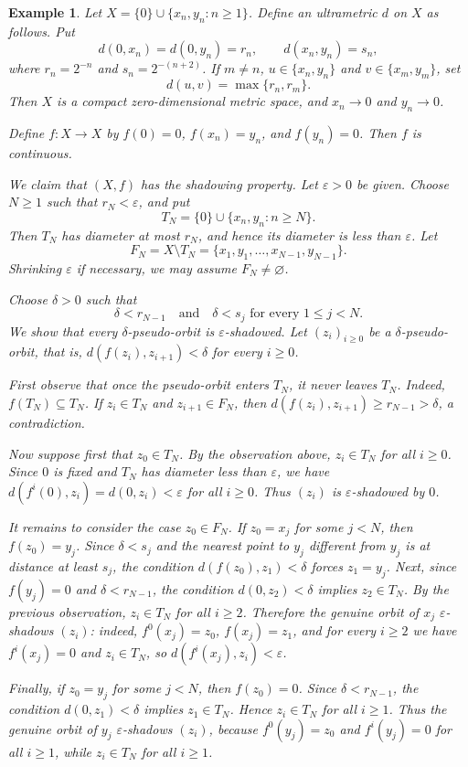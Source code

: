 \documentclass[10pt,a4paper]{amsart}
\numberwithin{equation}{section}
\newtheorem{example}[theorem]{Example}
\begin{document}
\begin{example}
Let $X=\{0\}\cup\{x_n,y_n:n\geq 1\}$. Define an ultrametric $d$ on $X$ as
follows. Put
\[
    d(0,x_n)=d(0,y_n)=r_n,\qquad d(x_n,y_n)=s_n,
\]
where $r_n=2^{-n}$ and $s_n=2^{-(n+2)}$. If $m\neq n$,
$u\in\{x_n,y_n\}$ and $v\in\{x_m,y_m\}$, set
\[
    d(u,v)=\max\{r_n,r_m\}.
\]
Then $X$ is a compact zero-dimensional metric space, and $x_n\to 0$ and
$y_n\to 0$.

Define $f:X\to X$ by $f(0)=0$, $f(x_n)=y_n$, and $f(y_n)=0$. Then $f$ is
continuous.

We claim that $(X,f)$ has the shadowing property. Let $\varepsilon>0$ be given.
Choose $N\geq 1$ such that $r_N<\varepsilon$, and put
\[
    T_N=\{0\}\cup\{x_n,y_n:n\geq N\}.
\]
Then $T_N$ has diameter at most $r_N$, and hence its diameter is less than
$\varepsilon$. Let
\[
    F_N=X\setminus T_N=\{x_1,y_1,\ldots,x_{N-1},y_{N-1}\}.
\]
Shrinking $\varepsilon$ if necessary,  we may assume
$F_N\neq\varnothing$.

Choose $\delta>0$ such that
\[
    \delta< r_{N-1}
    \quad\text{and}\quad
    \delta<s_j \text{ for every } 1\leq j<N.
\]
We show that every $\delta$-pseudo-orbit is $\varepsilon$-shadowed. Let
$(z_i)_{i\geq 0}$ be a $\delta$-pseudo-orbit, that is,
$d(f(z_i),z_{i+1})<\delta$ for every $i\geq 0$.

First observe that once the pseudo-orbit enters $T_N$, it never leaves $T_N$.
Indeed, $f(T_N)\subseteq T_N$. If $z_i\in T_N$ and $z_{i+1}\in F_N$, then
$d(f(z_i),z_{i+1})\geq r_{N-1}>\delta$, a contradiction.

Now suppose first that $z_0\in T_N$. By the observation above, $z_i\in T_N$ for
all $i\geq 0$. Since $0$ is fixed and $T_N$ has diameter less than
$\varepsilon$, we have $d(f^i(0),z_i)=d(0,z_i)<\varepsilon$ for all $i\geq 0$.
Thus $(z_i)$ is $\varepsilon$-shadowed by $0$.

It remains to consider the case $z_0\in F_N$. If $z_0=x_j$ for some $j<N$, then
$f(z_0)=y_j$. Since $\delta<s_j$ and the nearest point to $y_j$ different from
$y_j$ is at distance at least $s_j$, the condition
$d(f(z_0),z_1)<\delta$ forces $z_1=y_j$. Next, since $f(y_j)=0$ and
$\delta<r_{N-1}$, the condition $d(0,z_2)<\delta$ implies $z_2\in T_N$.
By the previous observation, $z_i\in T_N$ for all $i\geq 2$. Therefore the
genuine orbit of $x_j$ $\varepsilon$-shadows $(z_i)$: indeed,
$f^0(x_j)=z_0$, $f(x_j)=z_1$, and for every $i\geq 2$ we have
$f^i(x_j)=0$ and $z_i\in T_N$, so $d(f^i(x_j),z_i)<\varepsilon$.

Finally, if $z_0=y_j$ for some $j<N$, then $f(z_0)=0$. Since
$\delta<r_{N-1}$, the condition $d(0,z_1)<\delta$ implies $z_1\in T_N$.
Hence $z_i\in T_N$ for all $i\geq 1$. Thus the genuine orbit of $y_j$
$\varepsilon$-shadows $(z_i)$, because $f^0(y_j)=z_0$ and $f^i(y_j)=0$ for
all $i\geq 1$, while $z_i\in T_N$ for all $i\geq 1$.


\end{example}
\end{document}
